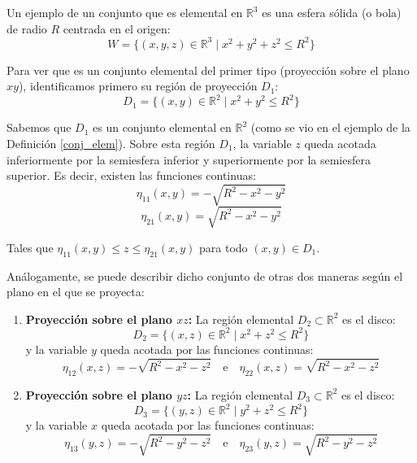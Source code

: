 \begin{example}
    Un ejemplo de un conjunto que es elemental en $\mathbb{R}^3$ es una esfera sólida (o bola) de radio $R$ centrada en el origen:
    $$W = \{(x,y,z) \in \mathbb{R}^3 \mid x^2 + y^2 + z^2 \leq R^2\}$$

    Para ver que es un conjunto elemental del primer tipo (proyección sobre el plano $xy$), identificamos primero su región de proyección $D_1$:
    $$D_1 = \{(x,y) \in \mathbb{R}^2 \mid x^2 + y^2 \leq R^2\}$$
    
    Sabemos que $D_1$ es un conjunto elemental en $\mathbb{R}^2$ (como se vio en el ejemplo de la Definición \ref{conj_elem}). Sobre esta región $D_1$, la variable $z$ queda acotada inferiormente por la semiesfera inferior y superiormente por la semiesfera superior. Es decir, existen las funciones continuas:
    $$ \eta_{11}(x,y) = -\sqrt{R^2 - x^2 - y^2} $$
    $$ \eta_{21}(x,y) = \sqrt{R^2 - x^2 - y^2} $$
    
    Tales que $\eta_{11}(x,y) \leq z \leq \eta_{21}(x,y)$ para todo $(x,y) \in D_1$. 

   Análogamente, se puede describir dicho conjunto de otras dos maneras según el plano en el que se proyecta:
\begin{enumerate}
    \item \textbf{Proyección sobre el plano $xz$:} La región elemental $D_2 \subset \mathbb{R}^2$ es el disco:
        \[
        D_2 = \{(x,z) \in \mathbb{R}^2 \mid x^2 + z^2 \leq R^2\}
        \]
        y la variable $y$ queda acotada por las funciones continuas:
        \[
        \eta_{12}(x,z) = -\sqrt{R^2 - x^2 - z^2} \quad \text{e} \quad \eta_{22}(x,z) = \sqrt{R^2 - x^2 - z^2}
        \]

    \item \textbf{Proyección sobre el plano $yz$:} La región elemental $D_3 \subset \mathbb{R}^2$ es el disco:
        \[
        D_3 = \{(y,z) \in \mathbb{R}^2 \mid y^2 + z^2 \leq R^2\}
        \]
        y la variable $x$ queda acotada por las funciones continuas:
        \[
        \eta_{13}(y,z) = -\sqrt{R^2 - y^2 - z^2} \quad \text{e} \quad \eta_{23}(y,z) = \sqrt{R^2 - y^2 - z^2}
        \]
\end{enumerate}

\begin{figure}[H]
    \centering
     
    \label{fig:Representación de la región W}
\end{figure}
\end{example}

